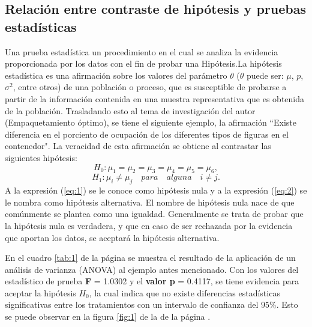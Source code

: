 \documentclass{article}
\begin{document}
\subsection{Relación entre contraste de hipótesis y pruebas estadísticas}
\label{sec:1}
Una prueba estadística un procedimiento en el cual se analiza la evidencia proporcionada por los datos con el fin de probar una Hipótesis.La hipótesis estadística es una afirmación sobre los valores del parámetro $\theta$ ($\theta$ puede ser: $\mu$, $p$, $\sigma^{2}$, entre otros) de una población o proceso, que es susceptible de probarse a partir de la información contenida en una muestra representativa que es obtenida de la población. Trasladando esto al tema de investigación del autor (Empaquetamiento óptimo), se tiene el siguiente ejemplo, la afirmación ``Existe diferencia en el porciento de ocupación  de los diferentes tipos de figuras en el contenedor". La veracidad de esta afirmación se obtiene al contrastar las siguientes hipótesis:
\begin{equation}\label{eq:1}
H_{0}:\mu_{1}=\mu_{2}=\mu_{3}=\mu_{4}=\mu_{5}=\mu_{6},    
\end{equation}
\begin{equation}\label{eq:2}
 H_{1}:\mu_{i}\neq\mu_{j}\quad para\quad alguna \quad i\neq j.
\end{equation}
A la expresión (\ref{eq:1}) se le conoce como hipótesis nula y a la expresión (\ref{eq:2}) se le nombra como hipótesis alternativa. El nombre de hipótesis nula nace de que comúnmente se plantea como una igualdad. Generalmente se trata de probar que la hipótesis nula es verdadera, y que en caso de ser rechazada por la evidencia que aportan los datos, se aceptará la hipótesis alternativa.

En el cuadro \ref{tab:1} de la página \pageref{tab:1} se muestra el resultado de la aplicación de un análisis de varianza (ANOVA) al ejemplo antes mencionado. Con los valores del estadístico de prueba \textbf{F} = 1.0302 y el \textbf{valor p} = 0.4117, se tiene evidencia para aceptar la hipótesis $H_{0}$, la cual indica que no existe diferencias estadísticas significativas entre los tratamientos con un intervalo de confianza del $95\%$. Esto se puede observar en la figura \ref{fig:1} de la de la página \pageref{fig:1}.  
\end{document}
